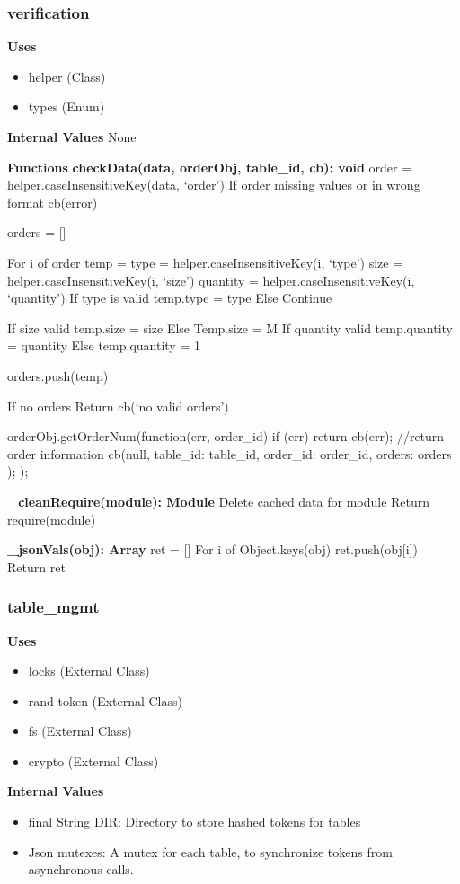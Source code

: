 \documentclass [10pt]{article}
\begin{document}
\subsubsection{verification}
\textbf{Uses}
\begin{itemize}
	\item helper (Class)
	\item types (Enum)
\end{itemize}

\textbf{Internal Values}
None

\textbf{Functions}
\textbf{checkData(data, orderObj, table\_id, cb): void}
order = helper.caseInsensitiveKey(data, ‘order’)
If order missing values or in wrong format
	cb(error)

orders = []

For i of order
	temp = {}
	type = helper.caseInsensitiveKey(i, ‘type’)
	size = helper.caseInsensitiveKey(i, ‘size’)
	quantity =  helper.caseInsensitiveKey(i, ‘quantity’)
	If type is valid
		temp.type = type
	Else
		Continue
	
	If size valid
		temp.size = size
	Else 
		Temp.size = M
	If quantity valid
		temp.quantity  = quantity 
	Else 
		temp.quantity  = 1
	
	orders.push(temp)

If no orders
	Return cb(‘no valid orders’)

orderObj.getOrderNum(function(err, order\_id) {
	if (err) {
		return cb(err);
	}
	//return order information
	cb(null, {
		table\_id: table\_id,
		order\_id: order\_id,
		orders: orders
	});
});

\textbf{\_cleanRequire(module): Module}
Delete cached data for module
Return require(module)

\textbf{\_jsonVals(obj): Array}
ret = []
For i of Object.keys(obj)
	ret.push(obj[i])
Return ret

\subsubsection{table\_mgmt}
\textbf{Uses}
\begin{itemize}
	\item locks (External Class)
	\item rand-token (External Class)
	\item fs (External Class)
	\item crypto (External Class)
\end{itemize}

\textbf{Internal Values}
\begin{itemize}
	\item final String DIR: Directory to store hashed tokens for tables
	\item Json mutexes: A mutex for each table, to synchronize tokens from asynchronous calls.
\end{itemize}
\end{document}
